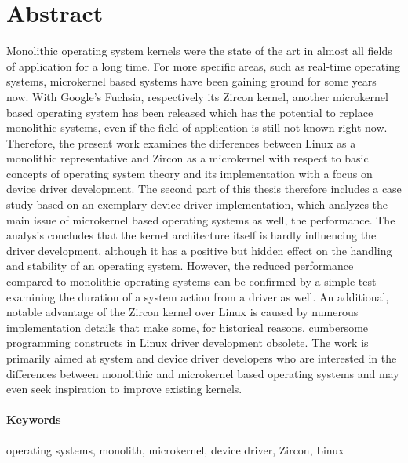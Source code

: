 \newpage

\section*{Abstract}
Monolithic operating system kernels were the state of the art in almost all fields of application for a long time.
For more specific areas, such as real-time operating systems, microkernel based systems have been gaining ground for some years now.
With Google's Fuchsia, respectively its Zircon kernel, another microkernel based operating system has been released which has the potential to replace monolithic systems, even if the field of application is still not known right now.
Therefore, the present work examines the differences between Linux as a monolithic representative and Zircon as a microkernel with respect to basic concepts of operating system theory and its implementation with a focus on device driver development.
The second part of this thesis therefore includes a case study based on an exemplary device driver implementation, which analyzes the main issue of microkernel based operating systems as well, the performance.
The analysis concludes that the kernel architecture itself is hardly influencing the driver development, although it has a positive but hidden effect on the handling and stability of an operating system.
However, the reduced performance compared to monolithic operating systems can be confirmed by a simple test examining the duration of a system action from a driver as well.
An additional, notable advantage of the Zircon kernel over Linux is caused by numerous implementation details that make some, for historical reasons, cumbersome programming constructs in Linux driver development obsolete.
The work is primarily aimed at system and device driver developers who are interested in the differences between monolithic and microkernel based operating systems and may even seek inspiration to improve existing kernels.

\paragraph{Keywords} operating systems, monolith, microkernel, device driver, Zircon, Linux


